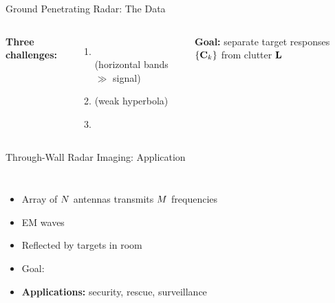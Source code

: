 \begin{frame}{Ground Penetrating Radar: The Data}
  \begin{columns}[T]
      \vspace{0.3em}
      \centering

      \vspace{0.3em}
      \textbf{Three challenges:}
      \begin{enumerate}
        \setlength{\itemsep}{0.1em}
        \item {}\\
              (horizontal bands $\gg$ signal)
        \item {} (weak hyperbola)
        \item {}
      \end{enumerate}

      \vspace{0.6em}
      \begin{shibiunote}
        \textbf{Goal:} separate target responses
        $\{\mathbf{C}_{k}\}$ from clutter $\mathbf{L}$
      \end{shibiunote}
  \end{columns}
\end{frame}

\begin{frame}{Through-Wall Radar Imaging: Application}
  \begin{columns}[T]
      \vspace{0.5em}
  

      \vspace{0.5em}
      \begin{itemize}
        \item Array of $N$ antennas transmits $M$ frequencies
        \pause
        \item EM waves 
        \pause
        \item Reflected by targets in room
        \pause
        \item Goal: 
        \item[\textbullet] \textbf{Applications:} security, rescue, surveillance
      \end{itemize}
  \end{columns}
\end{frame}

